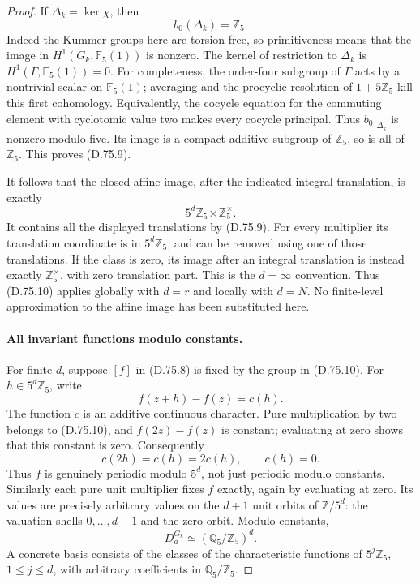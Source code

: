 \begin{proof}
If \(\Delta_k=\ker\chi\), then
\[
                       b_0(\Delta_k)=\mathbb Z_5.          \tag{D.75.9}
\]
Indeed the Kummer groups here are torsion-free, so primitiveness
means that the image in \(H^1(G_k,\mathbb F_5(1))\) is nonzero.
The kernel of restriction to \(\Delta_k\) is
\(H^1(\Gamma,\mathbb F_5(1))=0\). For completeness, the
order-four subgroup of \(\Gamma\) acts by a nontrivial scalar
on \(\mathbb F_5(1)\); averaging and the procyclic resolution
of \(1+5\mathbb Z_5\) kill this first cohomology. Equivalently,
the cocycle equation for the commuting element with
cyclotomic value two makes every cocycle principal.
Thus \(b_0|_{\Delta_k}\) is nonzero modulo five. Its image
is a compact additive subgroup of \(\mathbb Z_5\), so is all
of \(\mathbb Z_5\). This proves (D.75.9).

It follows that the closed affine image, after the indicated
integral translation, is exactly
\[
                  5^d\mathbb Z_5\rtimes\mathbb Z_5^\times.
                                                               \tag{D.75.10}
\]
It contains all the displayed translations by (D.75.9).
For every multiplier its translation coordinate is in
\(5^d\mathbb Z_5\), and can be removed using one of those
translations. If the class is zero, its image after an integral
translation is instead exactly \(\mathbb Z_5^\times\), with
zero translation part. This is the \(d=\infty\) convention.
Thus (D.75.10) applies globally with \(d=r\) and locally with
\(d=N\). No finite-level approximation to the affine image
has been substituted here.

\paragraph{All invariant functions modulo constants.}
For finite \(d\), suppose \([f]\) in (D.75.8) is fixed by
the group in (D.75.10). For \(h\in5^d\mathbb Z_5\), write
\[
                         f(z+h)-f(z)=c(h).
 \]
The function \(c\) is an additive continuous character.
Pure multiplication by two belongs to (D.75.10), and
\(f(2z)-f(z)\) is constant; evaluating at zero shows that
this constant is zero. Consequently
\[
                         c(2h)=c(h)=2c(h),\qquad c(h)=0.
 \]
Thus \(f\) is genuinely periodic modulo \(5^d\), not just
periodic modulo constants. Similarly each pure unit multiplier
fixes \(f\) exactly, again by evaluating at zero.
Its values are precisely arbitrary values on the \(d+1\)
unit orbits of \(\mathbb Z/5^d\): the valuation shells
\(0,\ldots,d-1\) and the zero orbit. Modulo constants,
\[
 D_a^{G_k}\simeq(\mathbb Q_5/\mathbb Z_5)^d.
                                                               \tag{D.75.11}
\]
A concrete basis consists of the classes of the characteristic
functions of \(5^j\mathbb Z_5\), \(1\le j\le d\), with arbitrary
coefficients in \(\mathbb Q_5/\mathbb Z_5\).


\end{proof}
